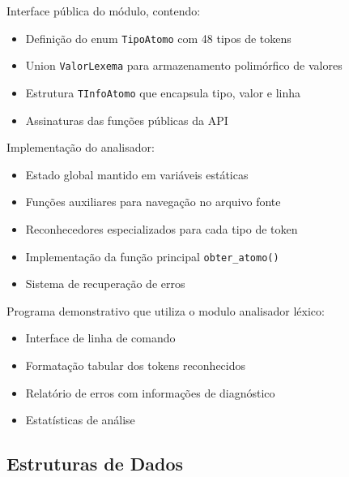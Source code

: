 \documentclass[12pt]{article}
\begin{document}
\begin{description}[leftmargin=!,labelwidth=4cm]
    \item[\texttt{analisador\_lexico.h}] Interface pública do módulo, contendo:
    \begin{itemize}[noitemsep]
        \item Definição do enum \texttt{TipoAtomo} com 48 tipos de tokens
        \item Union \texttt{ValorLexema} para armazenamento polimórfico de valores
        \item Estrutura \texttt{TInfoAtomo} que encapsula tipo, valor e linha
        \item Assinaturas das funções públicas da API
    \end{itemize}
    
    \item[\texttt{analisador\_lexico.c}] Implementação do analisador:
    \begin{itemize}[noitemsep]
        \item Estado global mantido em variáveis estáticas
        \item Funções auxiliares para navegação no arquivo fonte
        \item Reconhecedores especializados para cada tipo de token
        \item Implementação da função principal \texttt{obter\_atomo()}
        \item Sistema de recuperação de erros
    \end{itemize}

    \item[\texttt{main.c}] Programa demonstrativo que utiliza o modulo analisador léxico:
    \begin{itemize}[noitemsep]
        \item Interface de linha de comando
        \item Formatação tabular dos tokens reconhecidos
        \item Relatório de erros com informações de diagnóstico
        \item Estatísticas de análise
    \end{itemize}
\end{description}

\subsection{Estruturas de Dados}
\end{document}
